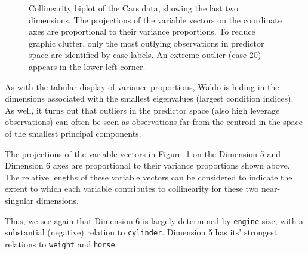 \documentclass[
  letterpaper,
  10pt,
  krantz2]{krantz}
\begin{document}
{\begin{figure}[H]


\caption{\label{fig-cars-collin-biplot}Collinearity biplot of the Cars
data, showing the last two dimensions. The projections of the variable
vectors on the coordinate axes are proportional to their variance
proportions. To reduce graphic clutter, only the most outlying
observations in predictor space are identified by case labels. An
extreme outlier (case 20) appears in the lower left corner.}

\end{figure}%

As with the tabular display of variance proportions, Waldo is hiding in
the dimensions associated with the smallest eigenvalues (largest
condition indices).\\
As well, it turns out that outliers in the predictor space (also high
leverage observations) can often be seen as observations far from the
centroid in the space of the smallest principal components.

The projections of the variable vectors in
Figure~\ref{fig-cars-collin-biplot} on the Dimension 5 and Dimension 6
axes are proportional to their variance proportions shown above. The
relative lengths of these variable vectors can be considered to indicate
the extent to which each variable contributes to collinearity for these
two near-singular dimensions.

Thus, we see again that Dimension 6 is largely determined by
\texttt{engine} size, with a substantial (negative) relation to
\texttt{cylinder}. Dimension 5 has its' strongest relations to
\texttt{weight} and \texttt{horse}.

}
\end{document}

